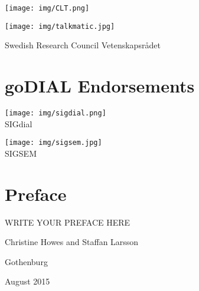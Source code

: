 \documentclass[a4paper,12pt,oneside]{book}
\begin{document}
\begin{center}
\begin{minipage}{6cm}\centering \small
\texttt{[image: img/CLT.png]}
\end{minipage}\hspace{2.5cm}
\begin{minipage}{6cm}\centering \small
\texttt{[image: img/talkmatic.jpg]}\\
\end{minipage}

\vspace{2cm}
\begin{minipage}{6cm}\centering
Swedish Research Council Vetenskapsrådet 
\end{minipage}
\end{center}

\vfill
\section*{goDIAL Endorsements}

\begin{center}
\begin{minipage}{6cm}\centering \small
\texttt{[image: img/sigdial.png]}\\
SIGdial
\end{minipage}
\begin{minipage}{6cm}\centering \small
\texttt{[image: img/sigsem.jpg]}\\
SIGSEM
\end{minipage}
\end{center}

\clearpage

\section*{Preface}

WRITE YOUR PREFACE HERE

\vspace{20pt}
\hfill Christine Howes and Staffan Larsson

\hfill Gothenburg

\hfill August 2015

\clearpage
\end{document}
